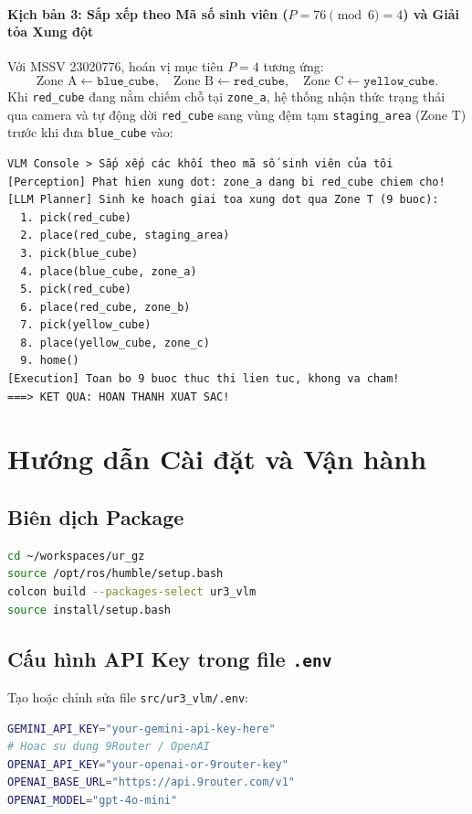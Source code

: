 \documentclass[a4paper,12pt]{article}
\begin{document}
\paragraph{Kịch bản 3: Sắp xếp theo Mã số sinh viên ($P = 76 \pmod 6 = 4$) và Giải tỏa Xung đột}
Với MSSV 23020776, hoán vị mục tiêu $P=4$ tương ứng:
\[
\text{Zone A} \leftarrow \texttt{blue\_cube}, \quad \text{Zone B} \leftarrow \texttt{red\_cube}, \quad \text{Zone C} \leftarrow \texttt{yellow\_cube}.
\]
Khi \texttt{red\_cube} đang nằm chiếm chỗ tại \texttt{zone\_a}, hệ thống nhận thức trạng thái qua camera và tự động dời \texttt{red\_cube} sang vùng đệm tạm \texttt{staging\_area} (Zone T) trước khi đưa \texttt{blue\_cube} vào:
\begin{lstlisting}
VLM Console > Sắp xếp các khối theo mã số sinh viên của tôi
[Perception] Phat hien xung dot: zone_a dang bi red_cube chiem cho!
[LLM Planner] Sinh ke hoach giai toa xung dot qua Zone T (9 buoc):
  1. pick(red_cube)
  2. place(red_cube, staging_area)
  3. pick(blue_cube)
  4. place(blue_cube, zone_a)
  5. pick(red_cube)
  6. place(red_cube, zone_b)
  7. pick(yellow_cube)
  8. place(yellow_cube, zone_c)
  9. home()
[Execution] Toan bo 9 buoc thuc thi lien tuc, khong va cham!
===> KET QUA: HOAN THANH XUAT SAC!
\end{lstlisting}

\section{Hướng dẫn Cài đặt và Vận hành}

\subsection{Biên dịch Package}
\begin{lstlisting}[language=bash]
cd ~/workspaces/ur_gz
source /opt/ros/humble/setup.bash
colcon build --packages-select ur3_vlm
source install/setup.bash
\end{lstlisting}

\subsection{Cấu hình API Key trong file \texttt{.env}}
Tạo hoặc chỉnh sửa file \texttt{src/ur3_vlm/.env}:
\begin{lstlisting}[language=bash]
GEMINI_API_KEY="your-gemini-api-key-here"
# Hoac su dung 9Router / OpenAI
OPENAI_API_KEY="your-openai-or-9router-key"
OPENAI_BASE_URL="https://api.9router.com/v1"
OPENAI_MODEL="gpt-4o-mini"
\end{lstlisting}
\end{document}

